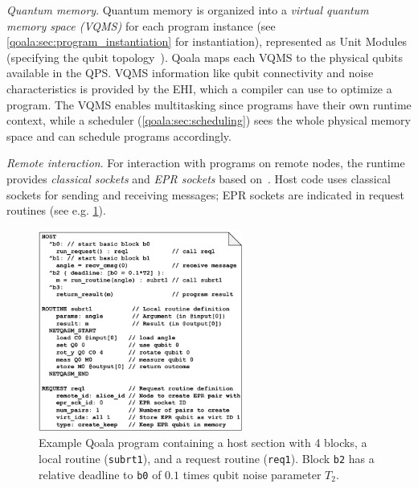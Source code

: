 \textit{Quantum memory}.
Quantum memory is organized into a \textit{virtual quantum memory space (VQMS)} for each program instance (see \cref{qoala:sec:program_instantiation} for instantiation), represented as Unit Modules (specifying the qubit topology~\cite{dahlberg2022netqasm}).
Qoala maps each VQMS to the physical qubits available in the QPS.
VQMS information like qubit connectivity and noise characteristics is provided by the EHI, which a compiler can use to optimize a program.
The VQMS enables multitasking since programs have their own runtime context, while a scheduler (\cref{qoala:sec:scheduling}) sees the whole physical memory space and can schedule programs accordingly.

\textit{Remote interaction}. For interaction with programs on remote nodes,
the runtime provides \textit{classical sockets} and \textit{EPR sockets} based on~\cite{dahlberg2022netqasm}. Host code uses classical sockets for sending and receiving messages; EPR sockets are indicated in request routines (see e.g. \cref{qoala:fig:example_program}).

\begin{figure}
    \centering
    \includegraphics[width=0.6\textwidth]{figures/qoala/example_program.pdf}
    \caption{
        Example Qoala program containing a host section with 4 blocks, a local routine (\texttt{subrt1}),
        and a request routine (\texttt{req1}). Block \texttt{b2} has a relative deadline to \texttt{b0} of $0.1$ times qubit noise parameter $T_2$.
    }
    \label{qoala:fig:example_program}
\end{figure}

